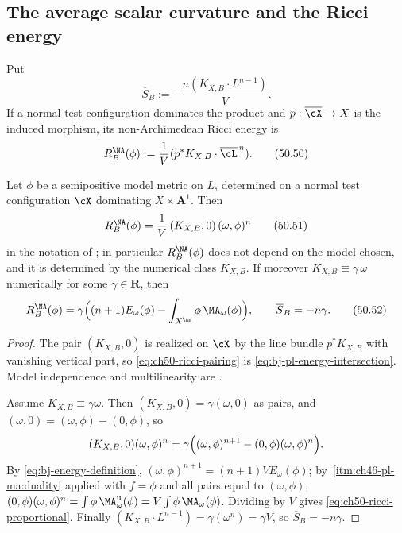 \subsection{The average scalar curvature and the Ricci energy}
\label{sec:ch50-ricci}

Put
\[
           \overline S_B
           :=-\frac{n(K_{X,B}\cdot L^{n-1})}{V}.
\tag{50.49}\label{eq:stability-average-scalar}
\]
If a normal test configuration dominates the product and
$p:\overline\cX\to X$ is the induced morphism, its non-Archimedean Ricci
energy is
\[
        R_B^{\NA}(\phi)
        :=\frac1V(p^*K_{X,B}\cdot\overline\cL^{\,n}).
\tag{50.50}\label{eq:stability-ricci-energy}
\]

\par\noindent\begin{minipage}{\textwidth}
\begin{lemma}
\label{lem:ch50-ricci-energy}
Let $\phi$ be a semipositive model metric on $L$, determined on a
normal test configuration $\cX$ dominating $X\times\mathbf A^1$.  Then
\[
 R_B^{\NA}(\phi)=\frac1V\,(K_{X,B},0)\,(\omega,\phi)^n
\tag{50.51}\label{eq:ch50-ricci-pairing}
\]
in the notation of ; in particular
$R^{\NA}_B(\phi)$ does not depend on the model chosen, and it is
determined by the numerical class $K_{X,B}$.  If moreover
$K_{X,B}\equiv\gamma\,\omega$ numerically for some
$\gamma\in\mathbf R$, then
\[
 R^{\NA}_B(\phi)
 =\gamma\Bigl((n+1)E_\omega(\phi)-\int_{X^{\An}}\phi\,\MA_\omega(\phi)\Bigr),
 \qquad
 \overline S_B=-n\gamma .
\tag{50.52}\label{eq:ch50-ricci-proportional}
\]
\end{lemma}
\end{minipage}\par\medskip

\begin{proof}
The pair $(K_{X,B},0)$ is realized on $\overline\cX$ by the line bundle
$p^*K_{X,B}$ with vanishing vertical part, so
\eqref{eq:ch50-ricci-pairing} is
\eqref{eq:bj-pl-energy-intersection}.  Model independence and
multilinearity are .

Assume $K_{X,B}\equiv\gamma\omega$.  Then
$(K_{X,B},0)=\gamma(\omega,0)$ as pairs, and
$(\omega,0)=(\omega,\phi)-(0,\phi)$, so
\[
 (K_{X,B},0)(\omega,\phi)^n
 =\gamma\Bigl((\omega,\phi)^{n+1}-(0,\phi)(\omega,\phi)^n\Bigr).
\]
By \eqref{eq:bj-energy-definition}, $(\omega,\phi)^{n+1}=(n+1)VE_\omega(\phi)$;
by \,\cref{itm:ch46-pl-ma:duality} applied with
$f=\phi$ and all pairs equal to $(\omega,\phi)$,
$(0,\phi)(\omega,\phi)^n=\int\phi\,\MA^{\mathrm u}_\omega(\phi)
=V\int\phi\,\MA_\omega(\phi)$.  Dividing by $V$ gives
\eqref{eq:ch50-ricci-proportional}.  Finally
$(K_{X,B}\cdot L^{n-1})=\gamma(\omega^n)=\gamma V$, so
$\overline S_B=-n\gamma$.
\end{proof}

